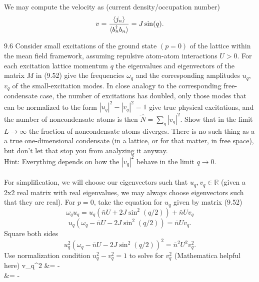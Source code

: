 \documentclass[10pt,letterpaper]{article}
\begin{document}
\item
We may compute the velocity as (current density/occupation number)
\[
	v = \frac{\braket{j_n}}{\braket{b_n^\dag b_n}} = J \sin(q).
\]
\newpage
\eenum
\item[9.6]
Consider small excitations of the ground state $(p=0)$ of the lattice within the mean field framework, assuming
repulsive atom-atom interactions $U>0$. For each excitation lattice momentum $q$ the eigenvalues and eigenvectors
of the matrix $M$ in (9.52) give the frequencies $\omega_q$ and the corresponding amplitudes $u_q$, $v_q$ of
the small-excitation modes. In close analogy to the corresponding free-condensate case, the number of excitations
has doubled, only those modes that can be normalized to the form $|u_q|^2-|v_q|^2=1$ give true physical
excitations, and the number of noncondensate atoms is then $\hat N = \sum_q |v_q|^2$. Show that
in the limit $L\to\infty$ the fraction of noncondensate atoms diverges. There is no such thing as a a true
one-dimensional condensate (in a lattice, or for that matter, in free space), but don't let that stop you from 
analyzing it anyway. 
\\ Hint: Everything depends on how the $|v_q|^2$ behave in the limit $q\to 0$. 
\\ \\
For simplification, we will choose our eigenvectors such that $u_q,v_q \in \mathbb R$ (given a 2x2 real matrix with
real eigenvalues, we may always choose eigenvectors such that they are real). For $p=0$, take the
equation for $u_q$ given by matrix (9.52)
\[
	\omega_q u_q = u_q(\bar n U+2J\sin^2(q/2))+\bar n U v_q
\]
\[
	u_q(\omega_q-\bar nU-2J\sin^2(q/2)) = \bar n U v_q.
\]
Square both sides
\[
	u_q^2(\omega_q-\bar n U-2J\sin^2(q/2))^2 = \bar n^2 U^2 v_q^2.
\]
Use normalization condition $u_q^2-v_q^2 = 1$ to solve for $v_q^2$ (Mathematica helpful here)
\ba
	v_q^2 &= -\\
		&= -\\
\end{document}
